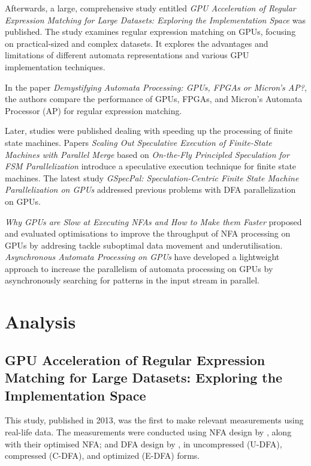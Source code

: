 \documentclass[10pt,onecolumn,twoside,english,a4paper]{article}
\begin{document}
Afterwards, a large, comprehensive study entitled \textit{GPU Acceleration of Regular Expression Matching for Large Datasets: Exploring the Implementation Space}\cite{Becchi:regex_large_dataset} was published. The study examines regular expression matching on GPUs, focusing on practical-sized and complex datasets. It explores the advantages and limitations of different automata representations and various GPU implementation techniques.

In the paper \textit{Demystifying Automata Processing: GPUs, FPGAs or Micron's AP?}\cite{Nourian:DemystifyingFSA}, the authors compare the performance of GPUs, FPGAs, and Micron's Automata Processor (AP) for regular expression matching.

Later, studies were published dealing with speeding up the processing of finite state machines. Papers \textit{Scaling Out Speculative Execution of Finite-State Machines with Parallel Merge}\cite{Xia:FSA-scaling} based on \textit{On-the-Fly Principled Speculation for FSM Parallelization}\cite{zhao2015fly} introduce a speculative execution technique for finite state machines. The latest study \textit{GSpecPal: Speculation-Centric
  Finite State Machine Parallelization on GPUs} \cite{yaneva2022gpuaccelerationFSA} addressed previous problems with DFA parallelization on GPUs.

\textit{Why GPUs are Slow at Executing NFAs and How to Make them Faster}\cite{Liu:WhyGPUSlowNFA} proposed and evaluated optimisations to improve the throughput of NFA processing on GPUs by addresing tackle suboptimal data movement and underutilisation.
\textit{Asynchronous Automata Processing on GPUs}\cite{Liu:Asynchronous} have developed a lightweight approach to increase the parallelism of automata processing on GPUs by asynchronously searching for patterns in the input stream in parallel.

\section{Analysis} \label{Analysis}
\subsection{GPU Acceleration of Regular Expression Matching for Large Datasets: Exploring the Implementation Space} \label{Becchi:regex_large_dataset_analysis}
This study\cite{Becchi:regex_large_dataset}, published in 2013, was the first to make relevant measurements using real-life data. The measurements were conducted using NFA design by \cite{cascarano2010infant}, along with their optimised NFA; and DFA design by \cite{becchi2007improved}, in uncompressed (U-DFA), compressed (C-DFA), and optimized (E-DFA) forms.
\end{document}
